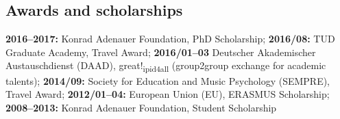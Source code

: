 \subsection{Awards and scholarships}

\textbf{2016--2017: } Konrad Adenauer Foundation, PhD Scholarship;
\textbf{2016/08: } TUD Graduate Academy, Travel Award;
\textbf{2016/01--03} Deutscher Akademischer Austauschdienst (DAAD),
    great!\textsubscript{ipid4all} (group2group exchange for academic talents);
\textbf{2014/09: } Society for Education and Music Psychology (SEMPRE), Travel Award;
\textbf{2012/01--04: } European Union (EU), ERASMUS Scholarship;
\textbf{2008--2013: } Konrad Adenauer Foundation, Student Scholarship
